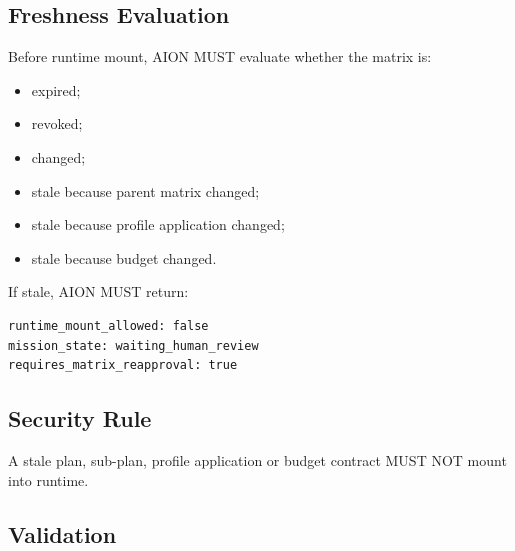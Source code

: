 \subsection{Freshness Evaluation}

Before runtime mount, AION MUST evaluate whether the matrix is:

\begin{itemize}
  \item expired;
  \item revoked;
  \item changed;
  \item stale because parent matrix changed;
  \item stale because profile application changed;
  \item stale because budget changed.
\end{itemize}

If stale, AION MUST return:

\begin{verbatim}
runtime_mount_allowed: false
mission_state: waiting_human_review
requires_matrix_reapproval: true
\end{verbatim}

\subsection{Security Rule}

A stale plan, sub-plan, profile application or budget contract MUST NOT mount into runtime.

\subsection{Validation}

